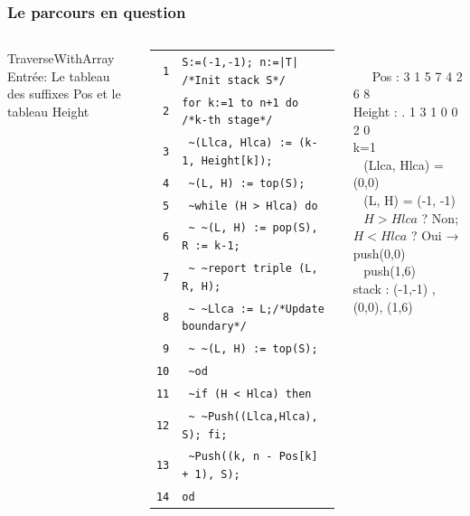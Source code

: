 \documentclass[10pt]{beamer}
\begin{document}
\begin{frame}

  \frametitle{Le parcours en question}

    \scriptsize
  \begin{columns}
      TraverseWithArray\\
      Entrée: Le tableau des suffixes Pos et le tableau Height\\ \hfill \\
      \begin{tabular}{r|l}
        \texttt{1}  & \verb!S:=(-1,-1); n:=|T| /*Init stack S*/!\\
        \texttt{2}  & \verb!for k:=1 to n+1 do /*k-th stage*/!\\
        \texttt{3}  & \verb! ~(Llca, Hlca) := (k-1, Height[k]);!\\
        \texttt{4}  & \verb! ~(L, H) := top(S);!\\
        \texttt{5}  & \verb! ~while (H > Hlca) do!\\
        \texttt{6}  & \verb! ~ ~(L, H) := pop(S), R := k-1;!\\
        \texttt{7}  & \verb! ~ ~report triple (L, R, H);!\\
        \texttt{8}  & \verb! ~ ~Llca := L;/*Update boundary*/!\\
        \texttt{9}  & \verb! ~ ~(L, H) := top(S);!\\
        \texttt{10} & \verb! ~od!\\
        \texttt{11} & \verb! ~if (H < Hlca) then!\\
        \texttt{12} & \verb! ~ ~Push((Llca,Hlca), S); fi;!\\
        \texttt{13} & \verb! ~Push((k, n - Pos[k] + 1), S);!\\
        \texttt{14} & \verb!od!\\
      \end{tabular}\\
       Pos : 3 1 5 7 4 2 6 8\\
    Height : . 1 3 1 0 0 2 0\\
    \vspace{0.5cm}
    \pause
    k=1\\
    ~ (Llca, Hlca) = (0,0)\\
    ~ (L, H) = (-1, -1)\\
    ~ $H > Hlca$ ? Non; $H < Hlca$ ? Oui → push(0,0)\\ 
    ~ push(1,6) \\
    stack : (-1,-1) , (0,0), (1,6)\\
    \vspace{1cm}
    \pause
    

\end{columns}
\end{frame}
\end{document}
